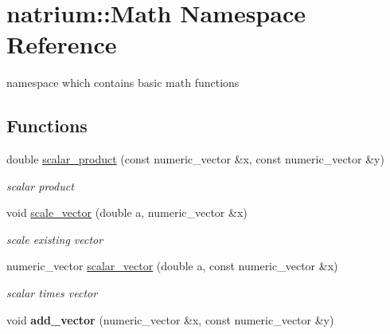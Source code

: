 \hypertarget{namespacenatrium_1_1Math}{
\section{natrium::Math Namespace Reference}
\label{namespacenatrium_1_1Math}
}


namespace which contains basic math functions  
\subsection*{Functions}
\begin{DoxyCompactItemize}
\item 
\hypertarget{namespacenatrium_1_1Math_a60a79394533003516ee1895b0cb93c73}{
double \hyperlink{namespacenatrium_1_1Math_a60a79394533003516ee1895b0cb93c73}{scalar\_\-product} (const numeric\_\-vector \&x, const numeric\_\-vector \&y)}
\label{namespacenatrium_1_1Math_a60a79394533003516ee1895b0cb93c73}

\begin{DoxyCompactList}\small\item\em scalar product \item\end{DoxyCompactList}\item 
\hypertarget{namespacenatrium_1_1Math_a951fe967a78de6add632ac1944465bf3}{
void \hyperlink{namespacenatrium_1_1Math_a951fe967a78de6add632ac1944465bf3}{scale\_\-vector} (double a, numeric\_\-vector \&x)}
\label{namespacenatrium_1_1Math_a951fe967a78de6add632ac1944465bf3}

\begin{DoxyCompactList}\small\item\em scale existing vector \item\end{DoxyCompactList}\item 
\hypertarget{namespacenatrium_1_1Math_af6c85a423e8c6ec87858a3d48669a271}{
numeric\_\-vector \hyperlink{namespacenatrium_1_1Math_af6c85a423e8c6ec87858a3d48669a271}{scalar\_\-vector} (double a, const numeric\_\-vector \&x)}
\label{namespacenatrium_1_1Math_af6c85a423e8c6ec87858a3d48669a271}

\begin{DoxyCompactList}\small\item\em scalar times vector \item\end{DoxyCompactList}\item 
\hypertarget{namespacenatrium_1_1Math_adce2097ce0c14661aac3eaff3a03e183}{
void {\bfseries add\_\-vector} (numeric\_\-vector \&x, const numeric\_\-vector \&y)}
\label{namespacenatrium_1_1Math_adce2097ce0c14661aac3eaff3a03e183}


\end{DoxyCompactItemize}
